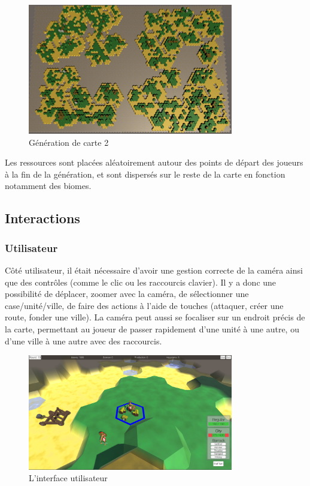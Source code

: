 \documentclass[12pt]{report}
\begin{document}
\begin{figure}[H]
    \centering
    \includegraphics[width=0.8\textwidth]{../report_2/img/MapGen2}
    \caption*{Génération de carte 2}
\end{figure}

Les ressources sont placées aléatoirement autour des points de départ des
joueurs à la fin de la génération, et sont dispersés sur le reste de la carte
en fonction notamment des biomes.

\subsection{Interactions}

\subsubsection{Utilisateur}

Côté utilisateur, il était nécessaire d’avoir une gestion correcte de la caméra
ainsi que des contrôles (comme le clic ou les raccourcis clavier). Il y a donc
une possibilité de déplacer, zoomer avec la caméra, de sélectionner une
case/unité/ville, de faire des actions à l’aide de touches (attaquer, créer une
route, fonder une ville). La caméra peut aussi se focaliser sur un endroit
précis de la carte, permettant au joueur de passer rapidement d’une unité à une
autre, ou d’une ville à une autre avec des raccourcis.

\begin{figure}[H]
    \centering
    \includegraphics[width=0.8\textwidth]{game_ui}
    \caption*{L'interface utilisateur}
\end{figure}
\end{document}
